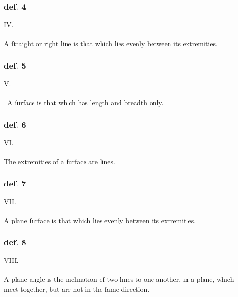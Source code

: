\begin{minipage}{0.67\textwidth}
    \subsubsection{def. 4}
    \begin{center}
        IV.\label{book1def4}\\
        \hfill\\
        A ſtraight or right line is that which lies evenly between its \mbox{extremities}.
    \end{center}
    \subsubsection{def. 5}
    \begin{center}
        V.\label{book1def5}\\
        \hfill\\\
        A ſurface is that which has length and breadth only.\\
    \end{center}
    \subsubsection{def. 6}
    \begin{center}
        VI.\label{book1def6}\\
        \hfill\\
        The extremities of a ſurface are lines.\\
    \end{center}
    \subsubsection{def. 7}
    \begin{center}
        VII.\label{book1def7}\\
        \hfill\\
        A plane ſurface is that which lies evenly between its extremities.\\
    \end{center}
\end{minipage}

\pagebreak

\begin{minipage}{0.67\textwidth}
    \subsubsection{def. 8}
    \begin{center}
        VIII.\label{book1def8}\\
        \hfill\\
        A plane angle is the inclination of two lines to one another, in a plane, which meet together, but are not in the ſame direction.
    \end{center}
\end{minipage}%
\begin{minipage}{0.33\textwidth}
    \phantom{}
\end{minipage}

